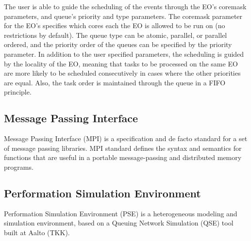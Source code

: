 The user is able to guide the scheduling of the events through the EO's coremask parameters, and queue's priority and type parameters. The coremask parameter for the EO's specifies which cores each the EO is allowed to be run on (no restrictions by default). The queue type can be atomic, parallel, or parallel ordered, and the priority order of the queues can be specified by the priority parameter. In addition to the user specified parameters, the scheduling is guided by the locality of the EO, meaning that tasks to be processed on the same EO are more likely to be scheduled consecutively in cases where the other priorities are equal. Also, the task order is maintained through the queue in a FIFO principle.

\subsection{Message Passing Interface}
Message Passing Interface (MPI) is a specification and de facto standard for a set of message passing libraries. MPI standard defines the syntax and semantics for functions that are useful in a portable message-passing and distributed memory programs.

\subsection{Performation Simulation Environment}
Performation Simulation Environment (PSE) is a heterogeneous modeling and simulation environment, based on a Queuing Network Simulation (QSE) tool built at Aalto (TKK).

